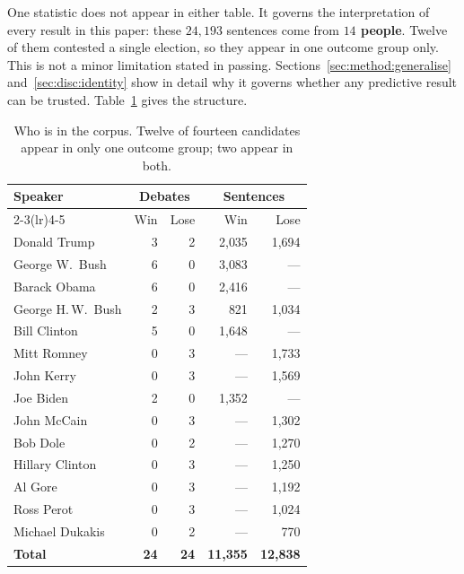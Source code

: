 \documentclass[pdflatex,sn-mathphys-num]{sn-jnl}%
\begin{document}
One statistic does not appear in either table. It governs the interpretation
of every result in this paper: these $24{,}193$ sentences come from
\textbf{$14$ people}. Twelve of them contested a single election, so they
appear in one outcome group only. This is not a minor limitation stated in
passing. Sections~\ref{sec:method:generalise} and~\ref{sec:disc:identity}
show in detail why it governs whether any predictive result can be trusted.
Table~\ref{tab:speakers} gives the structure.

\begin{table}[t]
\caption{Who is in the corpus. Twelve of fourteen candidates appear in only
one outcome group; two appear in both.}
\label{tab:speakers}
\centering
\footnotesize
\setlength{\tabcolsep}{4pt}
\begin{tabular}{lrrrr}
\toprule
Speaker & \multicolumn{2}{c}{Debates} & \multicolumn{2}{c}{Sentences} \\
\cmidrule(lr){2-3}\cmidrule(lr){4-5}
        & Win & Lose & Win & Lose \\
\midrule
Donald Trump        & 3 & 2 & 2{,}035 & 1{,}694 \\
George W.\ Bush     & 6 & 0 & 3{,}083 & --- \\
Barack Obama        & 6 & 0 & 2{,}416 & --- \\
George H.\,W.\ Bush & 2 & 3 & 821     & 1{,}034 \\
Bill Clinton        & 5 & 0 & 1{,}648 & --- \\
Mitt Romney         & 0 & 3 & ---     & 1{,}733 \\
John Kerry          & 0 & 3 & ---     & 1{,}569 \\
Joe Biden           & 2 & 0 & 1{,}352 & --- \\
John McCain         & 0 & 3 & ---     & 1{,}302 \\
Bob Dole            & 0 & 2 & ---     & 1{,}270 \\
Hillary Clinton     & 0 & 3 & ---     & 1{,}250 \\
Al Gore             & 0 & 3 & ---     & 1{,}192 \\
Ross Perot          & 0 & 3 & ---     & 1{,}024 \\
Michael Dukakis     & 0 & 2 & ---     & 770 \\
\midrule
\textbf{Total}      & \textbf{24} & \textbf{24} & \textbf{11{,}355} & \textbf{12{,}838} \\
\bottomrule
\end{tabular}
\end{table}
\end{document}
